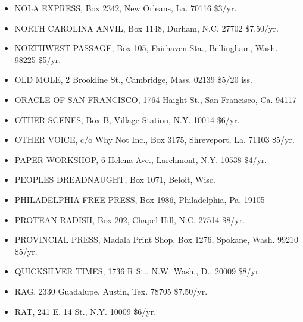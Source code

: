 \documentclass[11pt,twoside,a4paper]{book}
\begin{document}
\begin{minipage}[t]{0.20\textwidth}
\begin{scriptsize}
\begin{itemize}
	\item[] NOLA EXPRESS, Box 2342, New Orleans, La. 70116 \$3/yr. 
	\item[] NORTH CAROLINA ANVIL, Box 1148, Durham, N.C. 27702 \$7.50/yr. 
	\item[] NORTHWEST PASSAGE, Box 105, Fairhaven Sta., Bellingham, Wash. 98225	\$5/yr. 
	\item[] OLD MOLE, 2 Brookline St., Cambridge, Mass. 02139 \$5/20 iss. 
	\item[] ORACLE OF SAN FRANCISCO, 1764 Haight St., San Francisco, Ca. 94117 
	\item[] OTHER SCENES, Box B, Village Station, N.Y. 10014 \$6/yr. 
	\item[] OTHER VOICE, c/o Why Not Inc., Box 3175, Shreveport, La. 71103	\$5/yr. 
	\item[] PAPER WORKSHOP, 6 Helena Ave., Larchmont, N.Y. 10538 \$4/yr. 
	\item[] PEOPLES DREADNAUGHT, Box 1071, Beloit, Wisc. 
	\item[] PHILADELPHIA FREE PRESS, Box 1986, Philadelphia, Pa. 19105 
	\item[] PROTEAN RADISH, Box 202, Chapel Hill, N.C. 27514 \$8/yr. 
	\item[] PROVINCIAL PRESS, Madala Print Shop, Box 1276, Spokane, Wash. 99210	\$5/yr. 
	\item[] QUICKSILVER TIMES, 1736 R St., N.W. Wash., D.. 20009 \$8/yr. 
	\item[] RAG, 2330 Guadalupe, Austin, Tex. 78705 \$7.50/yr. 
	\item[] RAT, 241 E. 14 St., N.Y. 10009 \$6/yr. 
\end{itemize}
\end{scriptsize}
\end{minipage}
\end{document}
